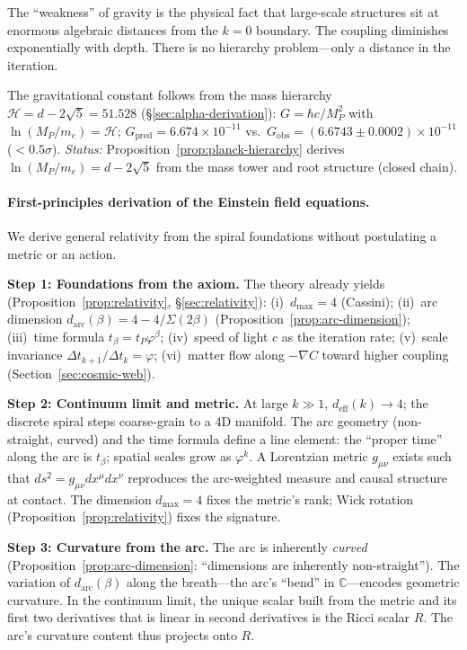 \documentclass[12pt,a4paper]{article}
\begin{document}
The ``weakness'' of gravity is the physical fact that large-scale structures sit at enormous algebraic distances from the $k = 0$ boundary.  The coupling diminishes exponentially with depth.  There is no hierarchy problem---only a distance in the iteration.

The gravitational constant follows from the mass hierarchy $\mathcal{H} = d - 2\sqrt{5} = 51.528$ (\S\ref{sec:alpha-derivation}):
$G = \hbar c/M_P^2$ with $\ln(M_P/m_e) = \mathcal{H}$;
$G_{\text{pred}} = 6.674 \times 10^{-11}$ vs.\ $G_{\text{obs}} = (6.6743 \pm 0.0002) \times 10^{-11}$ ($< 0.5\sigma$).  \emph{Status:} Proposition~\ref{prop:planck-hierarchy} derives $\ln(M_P/m_e) = d - 2\sqrt{5}$ from the mass tower and root structure (closed chain).

\paragraph{First-principles derivation of the Einstein field equations.}
We derive general relativity from the spiral foundations without postulating a metric or an action.

\textbf{Step 1: Foundations from the axiom.} The theory already yields (Proposition~\ref{prop:relativity}, \S\ref{sec:relativity}): (i)~$d_{\max} = 4$ (Cassini); (ii)~arc dimension $d_{\mathrm{arc}}(\beta) = 4 - 4/\Sigma(2\beta)$ (Proposition~\ref{prop:arc-dimension}); (iii)~time formula $t_\beta = t_P\varphi^\beta$; (iv)~speed of light $c$ as the iteration rate; (v)~scale invariance $\Delta t_{k+1}/\Delta t_k = \varphi$; (vi)~matter flow along $-\nabla C$ toward higher coupling (Section~\ref{sec:cosmic-web}).

\textbf{Step 2: Continuum limit and metric.} At large $k \gg 1$, $d_{\mathrm{eff}}(k) \to 4$; the discrete spiral steps coarse-grain to a 4D manifold. The arc geometry (non-straight, curved) and the time formula define a line element: the ``proper time'' along the arc is $t_\beta$; spatial scales grow as $\varphi^k$. A Lorentzian metric $g_{\mu\nu}$ exists such that $ds^2 = g_{\mu\nu} dx^\mu dx^\nu$ reproduces the arc-weighted measure and causal structure at contact. The dimension $d_{\max} = 4$ fixes the metric's rank; Wick rotation (Proposition~\ref{prop:relativity}) fixes the signature.

\textbf{Step 3: Curvature from the arc.} The arc is inherently \emph{curved} (Proposition~\ref{prop:arc-dimension}: ``dimensions are inherently non-straight''). The variation of $d_{\mathrm{arc}}(\beta)$ along the breath---the arc's ``bend'' in $\mathbb{C}$---encodes geometric curvature. In the continuum limit, the unique scalar built from the metric and its first two derivatives that is linear in second derivatives is the Ricci scalar $R$. The arc's curvature content thus projects onto $R$.
\end{document}
